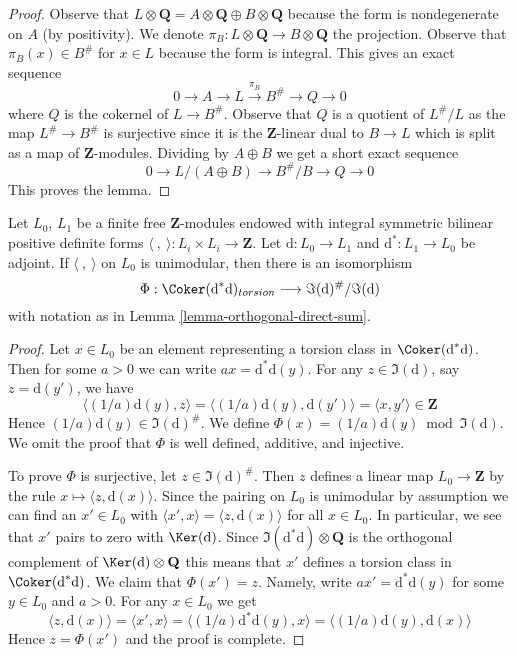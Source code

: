 \begin{proof}
Observe that
$L \otimes \mathbf{Q} = A \otimes \mathbf{Q} \oplus B \otimes \mathbf{Q}$
because the form is nondegenerate on $A$ (by positivity).
We denote $\pi_B : L \otimes \mathbf{Q} \to B \otimes \mathbf{Q}$
the projection. Observe that $\pi_B(x) \in B^\#$ for $x \in L$
because the form is integral. This gives an exact sequence
$$
0 \to A \to L \xrightarrow{\pi_B} B^\# \to Q \to 0
$$
where $Q$ is the cokernel of $L \to B^\#$. Observe that $Q$
is a quotient of $L^\#/L$ as the map $L^\# \to B^\#$ is surjective
since it is the $\mathbf{Z}$-linear dual to $B \to L$ which is split
as a map of $\mathbf{Z}$-modules.
Dividing by $A \oplus B$ we get a short exact sequence
$$
0 \to L/(A \oplus B) \to B^\#/B \to Q \to 0
$$
This proves the lemma.
\end{proof}

\begin{lemma}
\label{lemma-coker}
Let $L_0$, $L_1$ be a finite free $\mathbf{Z}$-modules endowed
with integral symmetric bilinear positive definite
forms $\langle\ ,\ \rangle : L_i \times L_i \to \mathbf{Z}$.
Let $\text{d} : L_0 \to L_1$ and $\text{d}^* : L_1 \to L_0$
be adjoint. If $\langle\ ,\ \rangle$ on $L_0$ is unimodular, then
there is an isomorphism
$$
\Phi :
\Coker(\text{d}^*\text{d})_{torsion}
\longrightarrow
\Im(\text{d})^\#/\Im(\text{d})
$$
with notation as in Lemma \ref{lemma-orthogonal-direct-sum}.
\end{lemma}

\begin{proof}
Let $x \in L_0$ be an element representing a torsion
class in $\Coker(\text{d}^*\text{d})$.
Then for some $a > 0$ we can write $ax = \text{d}^*\text{d}(y)$.
For any $z \in \Im(\text{d})$, say $z = \text{d}(y')$, we have
$$
\langle (1/a)\text{d}(y), z \rangle =
\langle (1/a)\text{d}(y), \text{d}(y') \rangle =
\langle x, y' \rangle \in \mathbf{Z}
$$
Hence $(1/a)\text{d}(y) \in \Im(\text{d})^\#$. We define
$\Phi(x) = (1/a)\text{d}(y) \bmod \Im(\text{d})$.
We omit the proof that $\Phi$ is well defined, additive, and injective.

\medskip\noindent
To prove $\Phi$ is surjective, let $z \in \Im(\text{d})^\#$.
Then $z$ defines a linear map $L_0 \to \mathbf{Z}$
by the rule $x \mapsto \langle z, \text{d}(x)\rangle$.
Since the pairing on $L_0$ is unimodular by assumption
we can find an $x' \in L_0$ with
$\langle x', x \rangle = \langle z, \text{d}(x)\rangle$
for all $x \in L_0$. In particular, we see
that $x'$ pairs to zero with $\Ker(\text{d})$.
Since $\Im(\text{d}^*\text{d}) \otimes \mathbf{Q}$
is the orthogonal complement of $\Ker(\text{d}) \otimes \mathbf{Q}$
this means that $x'$ defines a torsion class in
$\Coker(\text{d}^*\text{d})$. We claim that $\Phi(x') = z$.
Namely, write $a x' = \text{d}^*\text{d}(y)$
for some $y \in L_0$ and $a > 0$.
For any $x \in L_0$ we get
$$
\langle z, \text{d}(x)\rangle =
\langle x', x \rangle =
\langle (1/a)\text{d}^*\text{d}(y), x \rangle =
\langle (1/a)\text{d}(y),\text{d}(x) \rangle
$$
Hence $z = \Phi(x')$ and the proof is complete.
\end{proof}

